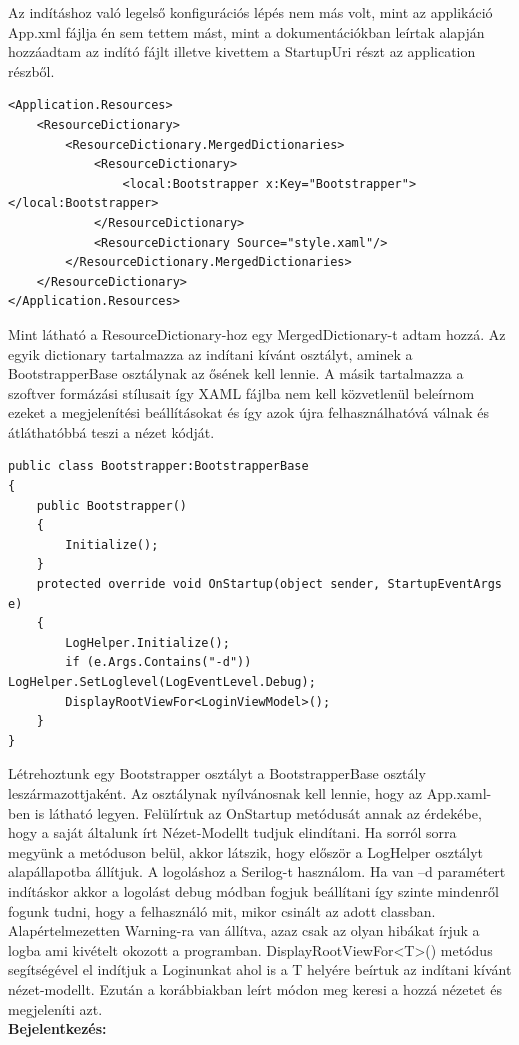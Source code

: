 \documentclass[
]{thesis-ekf}
\theoremstyle{definition}
\theoremstyle{remark}
\begin{document}
Az indításhoz való legelső konfigurációs lépés nem más volt, mint az applikáció App.xml fájlja én sem tettem mást, mint a dokumentációkban leírtak alapján hozzáadtam az indító fájlt illetve kivettem a StartupUri részt az application részből.
\begin{lstlisting}[caption={App.xml},captionpos=b]
<Application.Resources>
	<ResourceDictionary>
		<ResourceDictionary.MergedDictionaries>
			<ResourceDictionary>
				<local:Bootstrapper x:Key="Bootstrapper"></local:Bootstrapper>
			</ResourceDictionary>
			<ResourceDictionary Source="style.xaml"/>
		</ResourceDictionary.MergedDictionaries>
	</ResourceDictionary>        
</Application.Resources>
\end{lstlisting}
Mint látható a ResourceDictionary-hoz egy MergedDictionary-t adtam hozzá. Az egyik dictionary tartalmazza az indítani kívánt osztályt, aminek a BootstrapperBase osztálynak az ősének kell lennie. A másik tartalmazza a szoftver formázási stílusait így XAML fájlba nem kell közvetlenül beleírnom ezeket a megjelenítési beállításokat és így azok újra felhasználhatóvá válnak és átláthatóbbá teszi a nézet kódját.
\begin{lstlisting}[caption={Indításért felelős osztály},captionpos=b]
public class Bootstrapper:BootstrapperBase
{
	public Bootstrapper()
	{
		Initialize();
	}
	protected override void OnStartup(object sender, StartupEventArgs e)
	{
		LogHelper.Initialize();
		if (e.Args.Contains("-d")) LogHelper.SetLoglevel(LogEventLevel.Debug);
		DisplayRootViewFor<LoginViewModel>();
	}
}

\end{lstlisting}
Létrehoztunk egy Bootstrapper osztályt a BootstrapperBase osztály leszármazottjaként. Az osztálynak nyílvánosnak kell lennie, hogy az App.xaml-ben is látható legyen. Felülírtuk az OnStartup metódusát annak az érdekébe, hogy a saját általunk írt Nézet-Modellt tudjuk elindítani. Ha sorról sorra megyünk a metóduson belül, akkor látszik, hogy először a LogHelper osztályt alapállapotba állítjuk. A logoláshoz a Serilog-t használom. Ha van –d paramétert indításkor akkor a logolást debug módban fogjuk beállítani így szinte mindenről fogunk tudni, hogy a felhasználó mit, mikor csinált az adott classban. Alapértelmezetten Warning-ra van állítva, azaz csak az olyan hibákat írjuk a logba ami kivételt okozott a programban. DisplayRootViewFor<T>() metódus segítségével el indítjuk a Loginunkat ahol is a T helyére beírtuk az indítani kívánt nézet-modellt. Ezután a korábbiakban leírt módon meg keresi a hozzá nézetet és megjeleníti azt.\\
\textbf{Bejelentkezés:}
\end{document}

